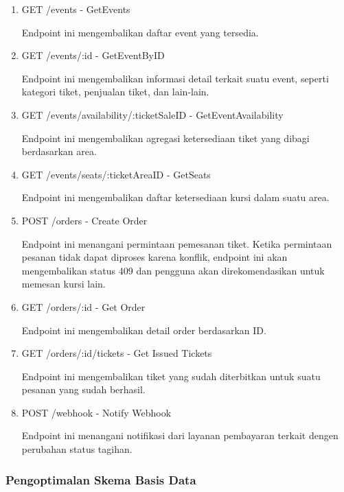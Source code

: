 \begin{enumerate}
      \item GET /events - GetEvents

            Endpoint ini mengembalikan daftar event yang tersedia.

      \item GET /events/:id - GetEventByID

            Endpoint ini mengembalikan informasi detail terkait suatu event, seperti kategori tiket, penjualan tiket, dan lain-lain.

      \item GET /events/availability/:ticketSaleID - GetEventAvailability

            Endpoint ini mengembalikan agregasi ketersediaan tiket yang dibagi berdasarkan area.

      \item GET /events/seats/:ticketAreaID - GetSeats

            Endpoint ini mengembalikan daftar ketersediaan kursi dalam suatu area.

      \item POST /orders - Create Order

            Endpoint ini menangani permintaan pemesanan tiket. Ketika permintaan pesanan tidak dapat diproses karena konflik, endpoint ini akan mengembalikan status 409 dan pengguna akan direkomendasikan untuk memesan kursi lain.

      \item GET /orders/:id - Get Order

            Endpoint ini mengembalikan detail order berdasarkan ID.

      \item GET /orders/:id/tickets - Get Issued Tickets

            Endpoint ini mengembalikan tiket yang sudah diterbitkan untuk suatu pesanan yang sudah berhasil.

      \item POST /webhook - Notify Webhook

            Endpoint ini menangani notifikasi dari layanan pembayaran terkait dengen perubahan status tagihan.
\end{enumerate}

\subsubsection{Pengoptimalan Skema Basis Data}

